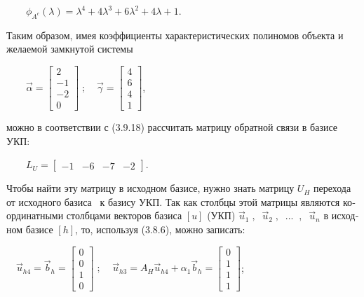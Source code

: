 \documentclass[a4paper]{article}
\begin{document}
{\begin{russian}\sffamily
\ \ \ \  $ϕ_{A^c}(λ)=λ^4+4λ^3+6λ^2+4λ+1$.
\end{russian}}

{\begin{russian}\sffamily
Таким образом, имея коэффициенты характеристических полиномов объекта и желаемой замкнутой системы
\end{russian}}

{\begin{russian}\sffamily
\ \ \ \  $\vec α=\left[\begin{matrix}2\\-1\\-2\\0\end{matrix}\right]\;;\;\;\ \;\vec
γ=\left[\begin{matrix}4\\6\\4\\1\end{matrix}\right]$,
\end{russian}}

{\begin{russian}\sffamily
можно в соответствии с (3.9.18) рассчитать матрицу обратной связи в базисе УКП:
\end{russian}}

{\begin{russian}\sffamily
\ \ \ \  $L_U=\left[\begin{matrix}-1&-6&-7&-2\end{matrix}\right]$.
\end{russian}}

{\begin{russian}\sffamily
Чтобы найти эту матрицу в исходном базисе, нужно знать матрицу  $U_H$ перехода от исходного базиса \ к базису УКП. Так
как столбцы этой матрицы являются координатными столбцами векторов базиса  $[u]$ (УКП)  $\vec u_1\;,\;\;\vec
u_2\;,\;\;...\;\;,\;\;\vec u_n$ в исходном базисе  $[h]$, то, используя (3.8.6), можно записать:
\end{russian}}

{\begin{russian}\sffamily
\ \  $\vec u_{\mathit{h4}}=\vec b_h=\left[\begin{matrix}0\\0\\1\\0\end{matrix}\right]\;;\;\;\;\;\vec
u_{\mathit{h3}}=A_H\vec u_{\mathit{h4}}+α_1\vec b_h=\left[\begin{matrix}0\\1\\1\\1\end{matrix}\right]$;
\end{russian}}
\end{document}
